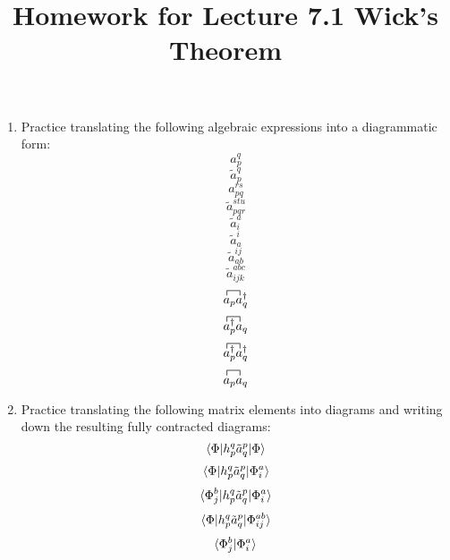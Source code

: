 \documentclass{article}
\title{Homework for Lecture 7.1 Wick's Theorem}
\date{}
\newcommand{\dg}{\ensuremath{^\dagger} }
\newcommand{\fctr}{\contraction}
\begin{document}
\maketitle
\noindent
\begin{enumerate}
\item Practice translating the following algebraic expressions into a diagrammatic form: 
\[ a_p^q\]
\[\tilde{a}_p^q \]
\[a_{pq}^{rs} \]
\[\tilde{a}_{pqr}^{stu} \]
\[\tilde{a}_i^a\]
\[\tilde{a}_a^i\]
\[\tilde{a}_{ab}^{ij}\]
\[\tilde{a}_{ijk}^{abc} \]
\[ \fctr{}{a}{{}_p }{a} a_p a_q\dg \]
\[ \fctr{}{a}{{}_p\dg }{a} a_p\dg a_q \]
\[ \fctr{}{a}{{}_p\dg }{a} a_p\dg a_q\dg \]
\[ \fctr{}{a}{{}_p }{a} a_p a_q \]
\item Practice translating the following matrix elements into diagrams and writing down the resulting fully contracted diagrams: 
\[ \braket{\Phi | h_p^q \tilde{a}_q^p|\Phi} \]
\[  \braket{\Phi | h_p^q \tilde{a}_q^p|\Phi_i^a} \]
\[  \braket{\Phi_j^b | h_p^q \tilde{a}_q^p|\Phi_i^a} \]
\[  \braket{\Phi | h_p^q \tilde{a}_q^p|\Phi_{ij}^{ab}} \]
\[  \braket{\Phi_{j}^{b}  |\Phi_{i}^{a}} \]
\end{enumerate}
\end{document}
